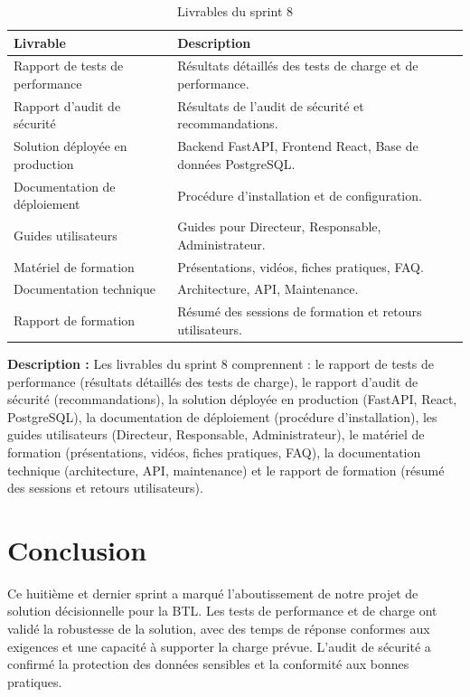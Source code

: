 \begin{table}[H]
\centering
\begin{tabular}{|p{4cm}|p{9cm}|}
\hline
\textbf{Livrable} & \textbf{Description} \\
\hline
Rapport de tests de performance & Résultats détaillés des tests de charge et de performance. \\
\hline
Rapport d'audit de sécurité & Résultats de l'audit de sécurité et recommandations. \\
\hline
Solution déployée en production & Backend FastAPI, Frontend React, Base de données PostgreSQL. \\
\hline
Documentation de déploiement & Procédure d'installation et de configuration. \\
\hline
Guides utilisateurs & Guides pour Directeur, Responsable, Administrateur. \\
\hline
Matériel de formation & Présentations, vidéos, fiches pratiques, FAQ. \\
\hline
Documentation technique & Architecture, API, Maintenance. \\
\hline
Rapport de formation & Résumé des sessions de formation et retours utilisateurs. \\
\hline
\end{tabular}
\caption{Livrables du sprint 8}
\label{tab:sprint8-livrables}
\end{table}



\textbf{Description :} Les livrables du sprint 8 comprennent : le rapport de tests de performance (résultats détaillés des tests de charge), le rapport d'audit de sécurité (recommandations), la solution déployée en production (FastAPI, React, PostgreSQL), la documentation de déploiement (procédure d'installation), les guides utilisateurs (Directeur, Responsable, Administrateur), le matériel de formation (présentations, vidéos, fiches pratiques, FAQ), la documentation technique (architecture, API, maintenance) et le rapport de formation (résumé des sessions et retours utilisateurs).

\section*{Conclusion}

Ce huitième et dernier sprint a marqué l'aboutissement de notre projet de solution décisionnelle pour la BTL. Les tests de performance et de charge ont validé la robustesse de la solution, avec des temps de réponse conformes aux exigences et une capacité à supporter la charge prévue. L'audit de sécurité a confirmé la protection des données sensibles et la conformité aux bonnes pratiques.

